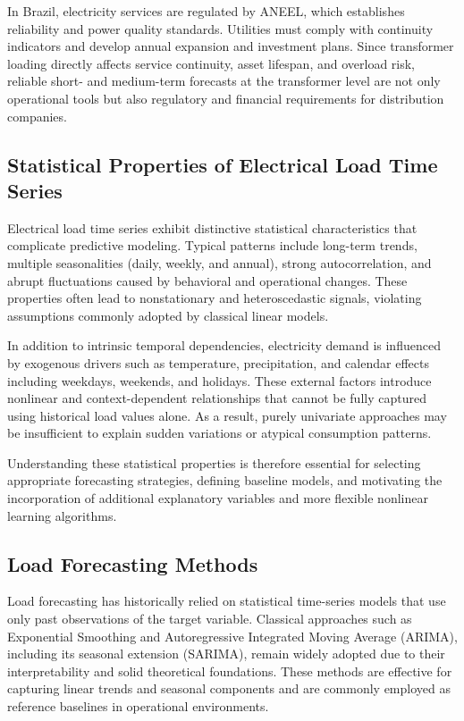 In Brazil, electricity services are regulated by ANEEL, which establishes reliability and power quality standards. Utilities must comply with continuity indicators and develop annual expansion and investment plans. Since transformer loading directly affects service continuity, asset lifespan, and overload risk, reliable short- and medium-term forecasts at the transformer level are not only operational tools but also regulatory and financial requirements for distribution companies.


\subsection{Statistical Properties of Electrical Load Time Series}

Electrical load time series exhibit distinctive statistical characteristics that complicate predictive modeling. Typical patterns include long-term trends, multiple seasonalities (daily, weekly, and annual), strong autocorrelation, and abrupt fluctuations caused by behavioral and operational changes. These properties often lead to nonstationary and heteroscedastic signals, violating assumptions commonly adopted by classical linear models.

In addition to intrinsic temporal dependencies, electricity demand is influenced by exogenous drivers such as temperature, precipitation, and calendar effects including weekdays, weekends, and holidays. These external factors introduce nonlinear and context-dependent relationships that cannot be fully captured using historical load values alone. As a result, purely univariate approaches may be insufficient to explain sudden variations or atypical consumption patterns.

Understanding these statistical properties is therefore essential for selecting appropriate forecasting strategies, defining baseline models, and motivating the incorporation of additional explanatory variables and more flexible nonlinear learning algorithms.

\subsection{Load Forecasting Methods}

Load forecasting has historically relied on statistical time-series models that use only past observations of the target variable. Classical approaches such as Exponential Smoothing and Autoregressive Integrated Moving Average (ARIMA), including its seasonal extension (SARIMA), remain widely adopted due to their interpretability and solid theoretical foundations. These methods are effective for capturing linear trends and seasonal components and are commonly employed as reference baselines in operational environments.

